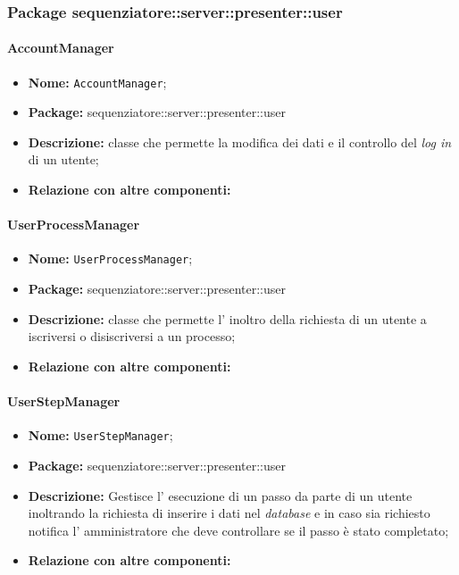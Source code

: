 \subsubsection{Package sequenziatore::server::presenter::user}
\paragraph{AccountManager}
	\begin{itemize}
		\item \textbf{Nome:} \texttt{AccountManager};
		\item \textbf{Package:} sequenziatore::server::presenter::user
		\item \textbf{Descrizione:} classe che permette la modifica dei dati e il controllo del \textit{log in} di un utente;
		\item \textbf{Relazione con altre componenti:}
	\end{itemize}
\paragraph{UserProcessManager}
	\begin{itemize}
		\item \textbf{Nome:} \texttt{UserProcessManager};
		\item \textbf{Package:} sequenziatore::server::presenter::user
		\item \textbf{Descrizione:} classe che permette l' inoltro della richiesta di un utente a iscriversi o disiscriversi a un processo;
		\item \textbf{Relazione con altre componenti:}
	\end{itemize}
\paragraph{UserStepManager}
	\begin{itemize}
		\item \textbf{Nome:} \texttt{UserStepManager};
		\item \textbf{Package:} sequenziatore::server::presenter::user
		\item \textbf{Descrizione:} Gestisce l' esecuzione di un passo da parte di un utente inoltrando la richiesta di inserire i dati nel \textit{database} e in caso sia richiesto notifica l' amministratore che deve controllare se il passo è stato completato;
		\item \textbf{Relazione con altre componenti:}
	\end{itemize}
